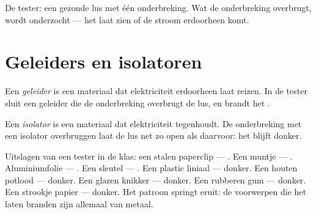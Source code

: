 \begin{omfigure}

{\small De tester: een gezonde lus met één onderbreking. Wat de
onderbreking overbrugt, wordt onderzocht --- het  laat zien of de
stroom erdoorheen komt.}
\end{omfigure}

\section{Geleiders en isolatoren}

\begin{definition}[Geleider]\label{def:g4:conductors-insulators:conductor}
Een \emph{geleider} is een materiaal dat
elektriciteit erdoorheen laat reizen. In de tester sluit een geleider
die de onderbreking overbrugt de lus, en brandt het .
\end{definition}

\begin{definition}[Isolator]\label{def:g4:conductors-insulators:insulator}
Een \emph{isolator} is een materiaal dat
elektriciteit tegenhoudt. De onderbreking met een isolator overbruggen
laat de lus net zo open als daarvoor: het  blijft donker.
\end{definition}

\begin{example}\label{ex:g4:conductors-insulators:trials}
Uitslagen van een tester in de klas: een stalen paperclip ---
. Een muntje --- . Aluminiumfolie --- . Een sleutel
--- . Een plastic liniaal --- donker. Een houten potlood ---
donker. Een glazen knikker --- donker. Een rubberen gum --- donker.
Een strookje papier --- donker. Het patroon springt eruit: de
voorwerpen die het  laten branden zijn allemaal van metaal.
\end{example}

